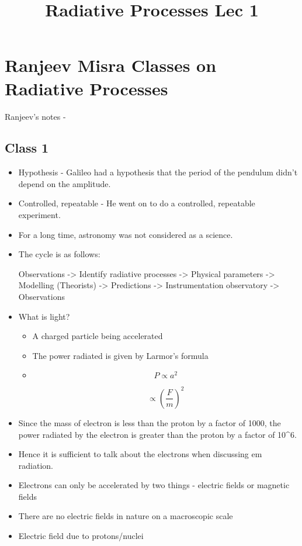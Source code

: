 \documentclass{../template/texnote}
\title{Radiative Processes Lec 1}
\begin{document}
    \maketitle {}
\section{Ranjeev Misra Classes on Radiative
Processes}\label{ranjeev-misra-classes-on-radiative-processes}

Ranjeev's notes - \cite{misra_lectures_nodate}

\subsection{Class 1}\label{class-1}

\begin{itemize}
\item
  Hypothesis - Galileo had a hypothesis that the period of the pendulum
  didn't depend on the amplitude.
\item
  Controlled, repeatable - He went on to do a controlled, repeatable
  experiment.
\item
  For a long time, astronomy was not considered as a science.
\item
  The cycle is as follows:

  Observations -\textgreater{} Identify radiative processes
  -\textgreater{} Physical parameters -\textgreater{} Modelling
  (Theorists) -\textgreater{} Predictions -\textgreater{}
  Instrumentation observatory -\textgreater{} Observations
\item
  What is light?

  \begin{itemize}
  \item
    A charged particle being accelerated
  \item
    The power radiated is given by Larmor's formula
  \item
    \[P \propto a^2\]

    \[\propto \left( \frac{F}{m}\right)^2\]
  \end{itemize}
\item
  Since the mass of electron is less than the proton by a factor of
  1000, the power radiated by the electron is greater than the proton by
  a factor of 10\^{}6.
\item
  Hence it is sufficient to talk about the electrons when discussing em
  radiation.
\item
  Electrons can only be accelerated by two things - electric fields or
  magnetic fields
\item
  There are no electric fields in nature on a macroscopic scale
\item
  Electric field due to protons/nuclei


\end{itemize}
\end{document}
